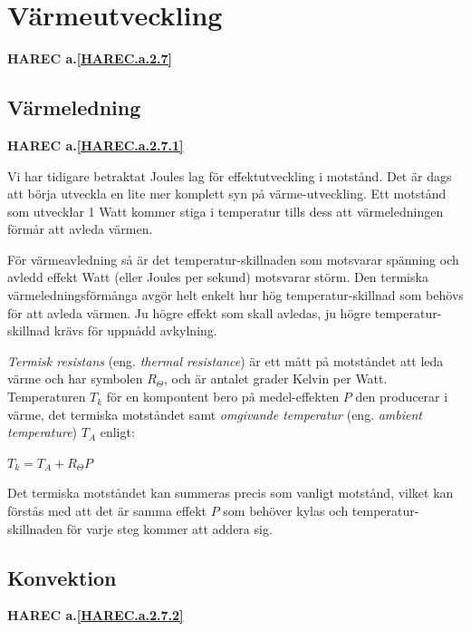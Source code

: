 \section{Värmeutveckling}
\textbf{
HAREC a.\ref{HAREC.a.2.7}\label{myHAREC.a.2.7}
}

\subsection{Värmeledning}
\textbf{
HAREC a.\ref{HAREC.a.2.7.1}\label{myHAREC.a.2.7.1}
}

Vi har tidigare betraktat Joules lag för effektutveckling i motstånd.
Det är dags att börja utveckla en lite mer komplett syn på värme-utveckling.
Ett motstånd som utvecklar 1 Watt kommer stiga i temperatur tills dess att
värmeledningen förmår att avleda värmen.

För värmeavledning så är det temperatur-skillnaden som motsvarar spänning och
avledd effekt Watt (eller Joules per sekund) motsvarar störm. Den termiska
värmeledningsförmånga avgör helt enkelt hur hög temperatur-skillnad som behövs
för att avleda värmen. Ju högre effekt som skall avledas, ju högre temperatur-
skillnad krävs för uppnådd avkylning.

\emph{Termisk resistans} (eng. \emph{thermal resistance}) är ett mått på
motståndet att leda värme och har symbolen \(R_\Theta\), och är antalet grader
Kelvin per Watt. Temperaturen \(T_k\) för en kompontent bero på medel-effekten
\(P\) den producerar i värme, det termiska motståndet samt
\emph{omgivande temperatur} (eng. \emph{ambient temperature}) \(T_A\) enligt:

\(T_k = T_A + R_\Theta P\)

Det termiska motståndet kan summeras precis som vanligt motstånd, vilket kan
förstås med att det är samma effekt \(P\) som behöver kylas och temperatur-
skillnaden för varje steg kommer att addera sig.

\subsection{Konvektion}
\textbf{
HAREC a.\ref{HAREC.a.2.7.2}\label{myHAREC.a.2.7.2}
}

